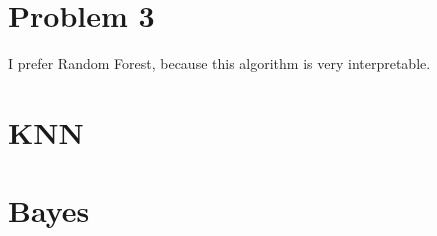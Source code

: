 \documentclass{article}
\begin{document}
    \section*{Problem 3}
        I prefer Random Forest, because this algorithm is very interpretable.
\pagebreak
\appendix
\section*{KNN}

\section*{Bayes}

\end{document}
